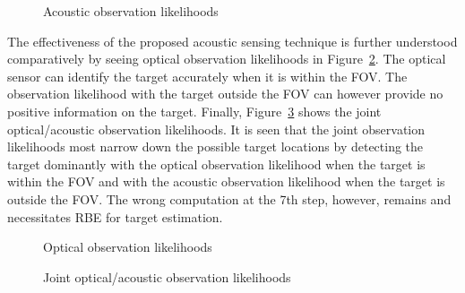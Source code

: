 \begin{figure}[ht]
	\centering
	\caption{Acoustic observation likelihoods}
	\label{fig:acoustic likelihoods}
\end{figure}

The effectiveness of the proposed acoustic sensing technique is further understood comparatively by seeing optical observation likelihoods in Figure~\ref{fig:optical likelihoods}.  The optical sensor can identify the target accurately when it is within the FOV.  The observation likelihood with the target outside the FOV can however provide no positive information on the target.  Finally, Figure~\ref{fig:joint likelihoods} shows the joint optical/acoustic observation likelihoods.  It is seen that the joint observation likelihoods most narrow down the possible target locations by detecting the target dominantly with the optical observation likelihood when the target is within the FOV and with the acoustic observation likelihood when the target is outside the FOV.  The wrong computation at the 7th step, however, remains and necessitates RBE for target estimation.  

\begin{figure}[ht]
	\centering
	\caption{Optical observation likelihoods}
	\label{fig:optical likelihoods}
\end{figure}

\begin{figure}[ht]
	\centering
	\caption{Joint optical/acoustic observation likelihoods}
	\label{fig:joint likelihoods}
\end{figure}


